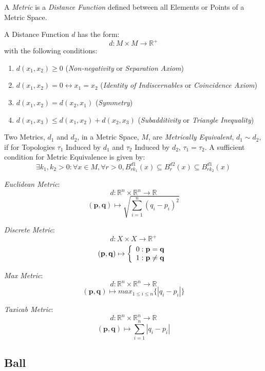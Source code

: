 A \emph{Metric} is a \emph{Distance Function} defined between all
Elements or Points of a Metric Space.

A Distance Function $d$ has the form:
\[
    d: M \times M \rightarrow \mathbb{R}^{+}
\]
with the following conditions:
\begin{enumerate}
\item $d(x_1, x_2) \geq 0$ (\emph{Non-negativity} or \emph{Separation
  Axiom})
\item $d(x_1, x_2) = 0 \leftrightarrow x_1 = x_2$ (\emph{Identity of
  Indiscernables} or \emph{Coincidence Axiom})
\item $d(x_1, x_2) = d(x_2, x_1)$ (\emph{Symmetry})
\item $d(x_1, x_3) \leq d(x_1, x_2) + d(x_2, x_3)$
  (\emph{Subadditivity} or \emph{Triangle Inequality})
\end{enumerate}
Two Metrics, $d_1$ and $d_2$, in a Metric Space, $M$, are
\emph{Metrically Equivalent}, $d_1 \sim d_2$, if for Topologies
$\tau_1$ Induced by $d_1$ and $\tau_2$ Induced by $d_2$, $\tau_1 =
\tau_2$. A sufficient condition for Metric Equivalence is given by:
\[
    \exists k_1, k_2 > 0 : \forall x \in M, \forall r > 0,
    B^{d1}_{rk_1}(x) \subseteq B^{d2}_r (x) \subseteq B^{d1}_{rk_2}(x)
\]

\emph{Euclidean Metric}:
\[
    d: \mathbb{R}^n \times \mathbb{R}^n \rightarrow \mathbb{R}
\]\[
    (\mathbf{p},\mathbf{q}) \mapsto \sqrt{\sum_{i=1}^{n}(q_i - p_i)^2}
\]

\emph{Discrete Metric}:
\[
    d: X \times X \rightarrow \mathbb{R}^{+}
\]\[
    (\mathbf{p},\mathbf{q}) \mapsto \left\{
    \begin{array}{l l}
        0: \mathbf{p} = \mathbf{q}\\
        1: \mathbf{p} \neq \mathbf{q}
    \end{array}\right.
\]

\emph{Max Metric}:
\[
    d: \mathbb{R}^n \times \mathbb{R}^n \rightarrow \mathbb{R}
\]\[
    (\mathbf{p},\mathbf{q}) \mapsto max_{1 \leq i \leq n}\{|q_i - p_i|\}
\]

\emph{Taxicab Metric}:
\[
    d: \mathbb{R}^n \times \mathbb{R}^n \rightarrow \mathbb{R}
\]\[
    (\mathbf{p},\mathbf{q}) \mapsto \sum_{i=1}^{n}|q_i - p_i|
\]



\subsection{Ball}\label{sec:metric_ball}

